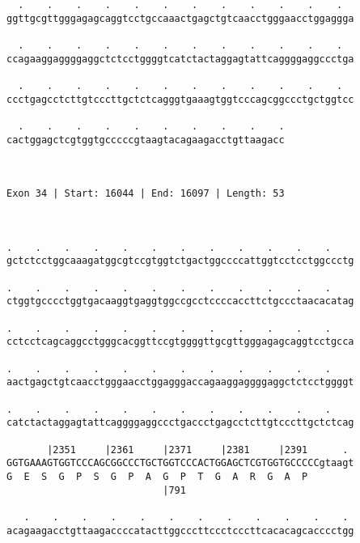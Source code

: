 \documentclass{article}
\begin{document}
\begin{Verbatim}
  .    .    .    .    .    .    .    .    .    .    .    .  
ggttgcgttgggagagcaggtcctgccaaactgagctgtcaacctgggaacctggaggga
                                                            
  .    .    .    .    .    .    .    .    .    .    .    .  
ccagaaggaggggaggctctcctggggtcatctactaggagtattcaggggaggccctga
                                                            
  .    .    .    .    .    .    .    .    .    .    .    .  
ccctgagcctcttgtcccttgctctcagggtgaaagtggtcccagcggccctgctggtcc
                                                            
  .    .    .    .    .    .    .    .    .    .
cactggagctcgtggtgcccccgtaagtacagaagacctgttaagacc
                                                
                                                
 
Exon 34 | Start: 16044 | End: 16097 | Length: 53



.    .    .    .    .    .    .    .    .    .    .    .    
gctctcctggcaaagatggcgtccgtggtctgactggccccattggtcctcctggccctg
                                                            
.    .    .    .    .    .    .    .    .    .    .    .    
ctggtgcccctggtgacaaggtgaggtggccgcctccccaccttctgccctaacacatag
                                                            
.    .    .    .    .    .    .    .    .    .    .    .    
cctcctcagcaggcctgggcacggttccgtggggttgcgttgggagagcaggtcctgcca
                                                            
.    .    .    .    .    .    .    .    .    .    .    .    
aactgagctgtcaacctgggaacctggagggaccagaaggaggggaggctctcctggggt
                                                            
.    .    .    .    .    .    .    .    .    .    .    .    
catctactaggagtattcaggggaggccctgaccctgagcctcttgtcccttgctctcag
                                                            
       |2351     |2361     |2371     |2381     |2391      . 
GGTGAAAGTGGTCCCAGCGGCCCTGCTGGTCCCACTGGAGCTCGTGGTGCCCCCgtaagt
G  E  S  G  P  S  G  P  A  G  P  T  G  A  R  G  A  P        
                           |791                             
  
   .    .    .    .    .    .    .    .    .    .    .    . 
acagaagacctgttaagaccccatacttggcccttccctcccttcacacagcacccctgg
                                                            

\end{Verbatim}
\end{document}
